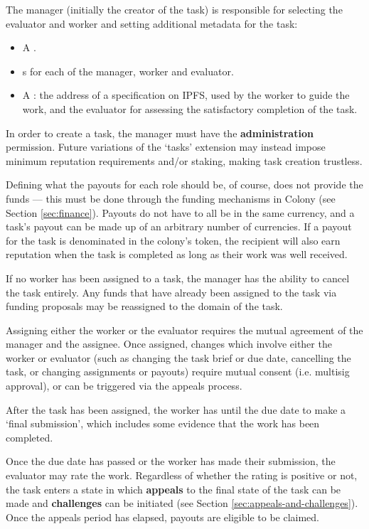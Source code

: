 The manager (initially the creator of the task) is responsible for selecting the evaluator and worker and setting additional metadata for the task:

\begin{itemize}
\item A .
\item {}s for each of the manager, worker and evaluator.
\item A : the address of a specification on IPFS, used by the worker to guide the work, and the evaluator for assessing the satisfactory completion of the task.
\end{itemize}

In order to create a task, the manager must have the \textbf{administration} permission. Future variations of the `tasks' extension may instead impose minimum reputation requirements and/or staking, making task creation trustless.

Defining what the payouts for each role should be, of course, does not provide the funds --- this must be done through the funding mechanisms in Colony (see Section \ref{sec:finance}). Payouts do not have to all be in the same currency, and a task's payout can be made up of an arbitrary number of currencies. If a payout for the task is denominated in the colony's token, the recipient will also earn reputation when the task is completed as long as their work was well received.

If no worker has been assigned to a task, the manager has the ability to cancel the task entirely. Any funds that have already been assigned to the task via funding proposals may be reassigned to the domain of the task.

Assigning either the worker or the evaluator requires the mutual agreement of the manager and the assignee. Once assigned, changes which involve either the worker or evaluator (such as changing the task brief or due date, cancelling the task, or changing assignments or payouts) require mutual consent (i.e. multisig approval), or can be triggered via the appeals process.

After the task has been assigned, the worker has until the due date to make a `final submission', which includes some evidence that the work has been completed.

Once the due date has passed or the worker has made their submission, the evaluator may rate the work. Regardless of whether the rating is positive or not, the task enters a state in which \textbf{appeals} to the final state of the task can be made and \textbf{challenges} can be initiated (see Section \ref{sec:appeals-and-challenges}). Once the appeals period has elapsed, payouts are eligible to be claimed. \\

